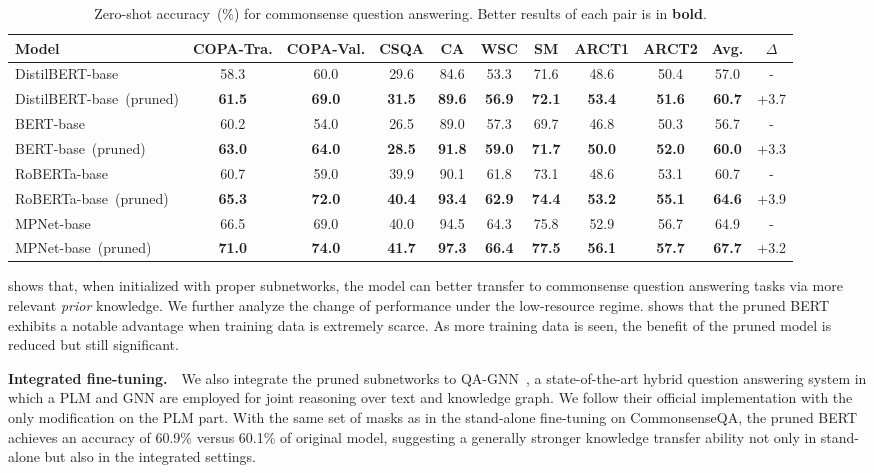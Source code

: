\begin{table}[th!]
	\centering
	\scriptsize
	\begin{tabular}{l|cccccccc|cc}
		\toprule
		\textbf{Model} &COPA-Tra. &COPA-Val. &CSQA &CA &WSC  &SM &ARCT1 &ARCT2 &Avg. &$\Delta$ \\
		\midrule
		DistilBERT-base &58.3 &60.0 &29.6 &84.6 &53.3  &71.6 &48.6 &50.4  &57.0 &  -  \\
		DistilBERT-base~(pruned) &\textbf{61.5} &\textbf{69.0} &\textbf{31.5} &\textbf{89.6} &\textbf{56.9}  &\textbf{72.1} &\textbf{53.4} &\textbf{51.6} & \textbf{60.7} &+3.7\\
		\midrule
		BERT-base &60.2 &54.0 &26.5 &89.0 &57.3  &69.7 &46.8 &50.3 &56.7 & -\\
		BERT-base~(pruned) &\textbf{63.0} &\textbf{64.0} &\textbf{28.5} &\textbf{91.8} &\textbf{59.0}  &\textbf{71.7} &\textbf{50.0} &\textbf{52.0}  & \textbf{60.0} &+3.3\\
		\midrule
		RoBERTa-base &60.7 &59.0 &39.9 &90.1 &61.8  &73.1 &48.6 &53.1 &60.7 &-\\
		RoBERTa-base~(pruned) &\textbf{65.3} &\textbf{72.0} &\textbf{40.4} &\textbf{93.4} &\textbf{62.9}  &\textbf{74.4} &\textbf{53.2} &\textbf{55.1} &\textbf{64.6} &+3.9 \\
		\midrule
		MPNet-base &66.5 &69.0 &40.0 &94.5 &64.3&75.8  &52.9 &56.7 &64.9 &- \\
		MPNet-base~(pruned) &\textbf{71.0} &\textbf{74.0} &\textbf{41.7} &\textbf{97.3} &\textbf{66.4}  &\textbf{77.5} &\textbf{56.1} &\textbf{57.7}  & \textbf{67.7} &+3.2\\
		\bottomrule
	\end{tabular}
	\caption{Zero-shot accuracy~(\%) for commonsense question answering. Better results of each pair is in \textbf{bold}.}
	\label{table:zeroshot}
\end{table}

 shows that, when initialized with proper subnetworks, the model can better transfer to commonsense question answering tasks via more relevant \textit{prior} knowledge. We further analyze the change of performance under the low-resource regime.  shows that the pruned BERT exhibits a notable advantage when training data is extremely scarce. As more training data is seen, the benefit of the pruned 
model is reduced but still significant. 

\textbf{Integrated fine-tuning.}~~We also integrate the pruned subnetworks to QA-GNN~\citep{qagnn}, 
a state-of-the-art hybrid question answering system in which a PLM and GNN are employed for joint reasoning 
over text and knowledge graph. We follow their official implementation with the only modification on the PLM part. With the same set of masks as in the stand-alone fine-tuning on CommonsenseQA, 
the pruned BERT achieves an accuracy of 60.9\% versus 60.1\% of original model, 
suggesting a generally stronger knowledge transfer ability not only in stand-alone but also in the integrated settings.



